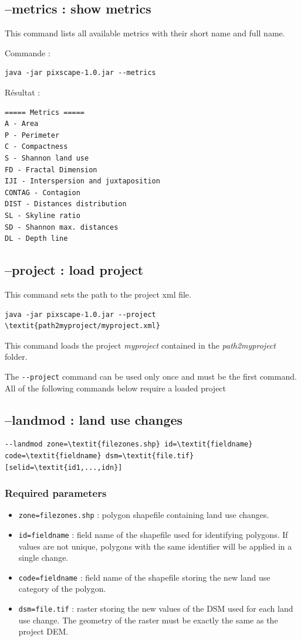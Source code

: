 \documentclass{report}
\begin{document}
\subsection{--metrics : show metrics}
This command lists all available metrics with their short name and full name.

Commande :
\begin{Verbatim}
java -jar pixscape-1.0.jar --metrics
\end{Verbatim}
Résultat :
\begin{Verbatim}
===== Metrics =====
A - Area
P - Perimeter
C - Compactness
S - Shannon land use
FD - Fractal Dimension
IJI - Interspersion and juxtaposition
CONTAG - Contagion
DIST - Distances distribution
SL - Skyline ratio
SD - Shannon max. distances
DL - Depth line
\end{Verbatim}

\subsection{--project : load project}
This command sets the path to the project xml file.
\begin{Verbatim}[commandchars=\\\{\}]
java -jar pixscape-1.0.jar --project \textit{path2myproject/myproject.xml}
\end{Verbatim}
This command loads the project \textit{myproject} contained in the \textit{path2myproject} folder.

The \verb|--project| command can be used only once and must be the first command.  All of the following commands below require a loaded project

\subsection{--landmod : land use changes}

\begin{Verbatim}[commandchars=\\\{\}]
--landmod zone=\textit{filezones.shp} id=\textit{fieldname} code=\textit{fieldname} dsm=\textit{file.tif} [selid=\textit{id1,...,idn}]
\end{Verbatim}

\subsubsection{Required parameters}
\begin{itemize}
	\item \verb|zone=filezones.shp| : polygon shapefile containing land use changes.
	\item \verb|id=fieldname| : field name of the shapefile used for identifying polygons. If values are not unique, polygons with the same identifier will be applied in a single change.
	\item \verb|code=fieldname| : field name of the shapefile storing the new land use category of the polygon.
	\item \verb|dsm=file.tif| : raster storing the new values of the DSM used for each land use change. The geometry of the raster must be exactly the same as the project DEM.
\end{itemize}
\end{document}
